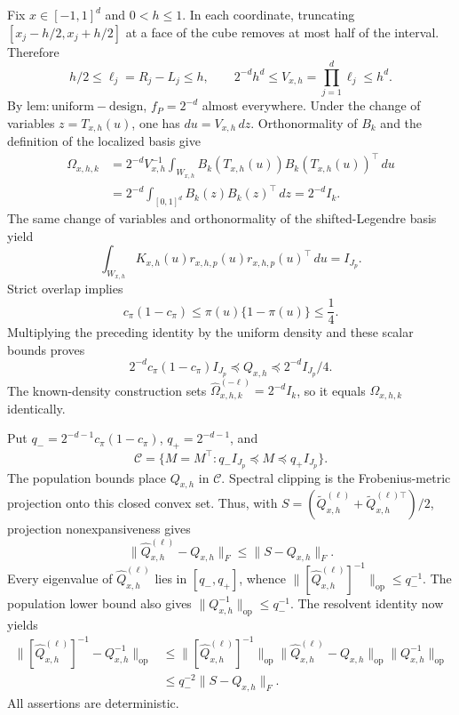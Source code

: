 Fix \(x\in[-1,1]^d\) and \(0<h\le1\). In each coordinate, truncating \([x_j-h/2,x_j+h/2]\) at a face of the cube removes at most half of the interval. Therefore
\[
h/2\le\ell_j=R_j-L_j\le h,
\qquad
2^{-d}h^d\le V_{x,h}=\prod_{j=1}^d\ell_j\le h^d.
\]
By \(\mathrm{lem:uniform-design}\), \(f_P=2^{-d}\) almost everywhere. Under the change of variables \(z=T_{x,h}(u)\), one has \(du=V_{x,h}\,dz\). Orthonormality of \(B_k\) and the definition of the localized basis give
\[
\begin{aligned}
\Omega_{x,h,k}
&=2^{-d}V_{x,h}^{-1}\int_{W_{x,h}}B_k(T_{x,h}(u))B_k(T_{x,h}(u))^\top\,du\\
&=2^{-d}\int_{[0,1]^d}B_k(z)B_k(z)^\top\,dz
=2^{-d}I_k.
\end{aligned}
\]
The same change of variables and orthonormality of the shifted-Legendre basis yield
\[
\int_{W_{x,h}}K_{x,h}(u)r_{x,h,p}(u)r_{x,h,p}(u)^\top\,du=I_{J_p}.
\]
Strict overlap implies
\[
c_\pi(1-c_\pi)\le\pi(u)\{1-\pi(u)\}\le\frac14.
\]
Multiplying the preceding identity by the uniform density and these scalar bounds proves
\[
2^{-d}c_\pi(1-c_\pi)I_{J_p}
\preceq Q_{x,h}
\preceq2^{-d}I_{J_p}/4.
\]
The known-density construction sets \(\widehat\Omega^{(-\ell)}_{x,h,k}=2^{-d}I_k\), so it equals \(\Omega_{x,h,k}\) identically.

Put \(q_-=2^{-d-1}c_\pi(1-c_\pi)\), \(q_+=2^{-d-1}\), and
\[
\mathcal C=\{M=M^\top:q_-I_{J_p}\preceq M\preceq q_+I_{J_p}\}.
\]
The population bounds place \(Q_{x,h}\) in \(\mathcal C\). Spectral clipping is the Frobenius-metric projection onto this closed convex set. Thus, with \(S=(\widetilde Q^{(\ell)}_{x,h}+\widetilde Q^{(\ell)\top}_{x,h})/2\), projection nonexpansiveness gives
\[
\|\widehat Q^{(\ell)}_{x,h}-Q_{x,h}\|_F\le\|S-Q_{x,h}\|_F.
\]
Every eigenvalue of \(\widehat Q^{(\ell)}_{x,h}\) lies in \([q_-,q_+]\), whence \(\|[\widehat Q^{(\ell)}_{x,h}]^{-1}\|_{\mathrm{op}}\le q_-^{-1}\). The population lower bound also gives \(\|Q_{x,h}^{-1}\|_{\mathrm{op}}\le q_-^{-1}\). The resolvent identity now yields
\[
\begin{aligned}
\|[\widehat Q^{(\ell)}_{x,h}]^{-1}-Q_{x,h}^{-1}\|_{\mathrm{op}}
&\le\|[\widehat Q^{(\ell)}_{x,h}]^{-1}\|_{\mathrm{op}}
\|\widehat Q^{(\ell)}_{x,h}-Q_{x,h}\|_{\mathrm{op}}
\|Q_{x,h}^{-1}\|_{\mathrm{op}}\\
&\le q_-^{-2}\|S-Q_{x,h}\|_F.
\end{aligned}
\]
All assertions are deterministic.